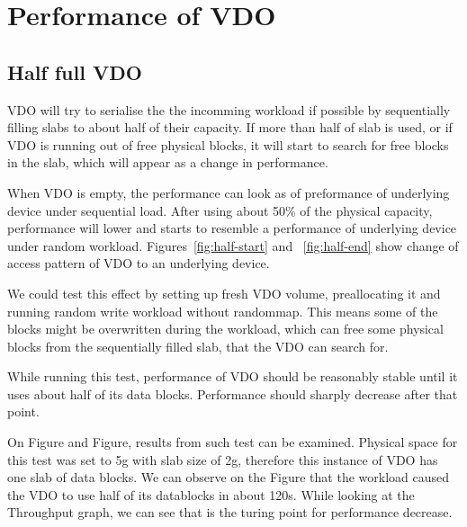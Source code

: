 \documentclass[
  color, %
  table, %
  lof,   %
  lot,   %
]{fithesis3}
\begin{document}
\chapter{Performance of VDO}
\label{testing}





\section{Half full VDO}
\label{half}
VDO will try to serialise the the incomming workload if possible by sequentially filling slabs to about half of their capacity. If more than half of slab is used, or if VDO is running out of free physical blocks, it will start to search for free blocks in the slab, which will appear as a change in performance. 

When VDO is empty, the performance can look as of preformance of underlying device under sequential load. After using about 50\% of the physical capacity, performance will lower and starts to resemble a performance of underlying device under random workload. Figures~\ref{fig:half-start} and ~\ref{fig:half-end} show change of access pattern of VDO to an underlying device.

We could test this effect by setting up fresh VDO volume, preallocating it and running random write workload without randommap. This means some of the blocks might be overwritten during the workload, which can free some physical blocks from the sequentially filled slab, that the VDO can search for.

While running this test, performance of VDO should be reasonably stable until it uses about half of its data blocks. Performance should sharply decrease after that point.

On Figure and Figure, results from such test can be examined. Physical space for this test was set to 5g with slab size of 2g, therefore this instance of VDO has one slab of data blocks. We can observe on the Figure that the workload caused the VDO to use half of its datablocks in about 120s. While looking at the Throughput graph, we can see that is the turing point for performance decrease.
\end{document}

